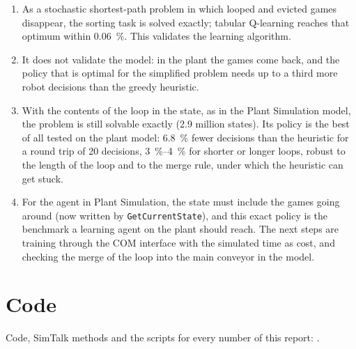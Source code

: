 \documentclass[11pt,a4paper]{article}
\begin{document}
\begin{enumerate}
  \item As a stochastic shortest-path problem in which looped and evicted games disappear, the sorting task is solved
    exactly; tabular Q-learning reaches that optimum within \SI{0.06}{\percent}. This validates the learning
    algorithm.
  \item It does not validate the model: in the plant the games come back, and the policy that is optimal for the
    simplified problem needs up to a third more robot decisions than the greedy heuristic.
  \item With the contents of the loop in the state, as in the Plant Simulation model, the problem is still solvable
    exactly (2.9 million states). Its policy is the best of all tested on the plant model: \SI{6.8}{\percent} fewer
    decisions than the heuristic for a round trip of 20 decisions, \SIrange{3}{4}{\percent} for shorter or longer
    loops, robust to the length of the loop and to the merge rule, under which the heuristic can get stuck.
  \item For the agent in Plant Simulation, the state must include the games going around (now written by
    \texttt{GetCurrentState}), and this exact policy is the benchmark a learning agent on the plant should reach.
    The next steps are training through the COM interface with the simulated time as cost, and checking the merge of
    the loop into the main conveyor in the model.
\end{enumerate}

\section*{Code}
Code, SimTalk methods and the scripts for every number of this report: \citet{Repo}.



\end{document}
